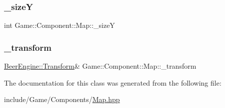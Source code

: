 \subsubsection{\texorpdfstring{\+\_\+sizeY}{\_sizeY}}
{\footnotesize\ttfamily int Game\+::\+Component\+::\+Map\+::\+\_\+sizeY}

\mbox{\label{class_game_1_1_component_1_1_map_a6e39d4388ddedb36803dd483ec22acda}} 
\subsubsection{\texorpdfstring{\+\_\+transform}{\_transform}}
{\footnotesize\ttfamily \mbox{\hyperlink{class_beer_engine_1_1_transform}{Beer\+Engine\+::\+Transform}}\& Game\+::\+Component\+::\+Map\+::\+\_\+transform\hspace{0.3cm}{\ttfamily [protected]}}



The documentation for this class was generated from the following file\+:\begin{DoxyCompactItemize}
\item 
include/\+Game/\+Components/\mbox{\hyperlink{_map_8hpp}{Map.\+hpp}}\end{DoxyCompactItemize}
